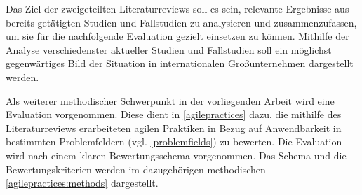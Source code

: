 Das Ziel der zweigeteilten Literaturreviews soll es sein, relevante Ergebnisse aus bereits getätigten Studien und Fallstudien zu analysieren und zusammenzufassen, um sie für die nachfolgende Evaluation gezielt einsetzen zu können. Mithilfe der Analyse verschiedenster aktueller Studien und Fallstudien soll ein möglichst gegenwärtiges Bild der Situation in internationalen Großunternehmen dargestellt werden.

Als weiterer methodischer Schwerpunkt in der vorliegenden Arbeit wird eine Evaluation vorgenommen. Diese dient in \ref{agilepractices} dazu, die mithilfe des Literaturreviews erarbeiteten agilen Praktiken in Bezug auf Anwendbarkeit in bestimmten Problemfeldern (vgl. \ref{problemfields}) zu bewerten. Die Evaluation wird nach einem klaren Bewertungsschema vorgenommen. Das Schema und die Bewertungskriterien werden im dazugehörigen methodischen \ref{agilepractices:methods} dargestellt.

